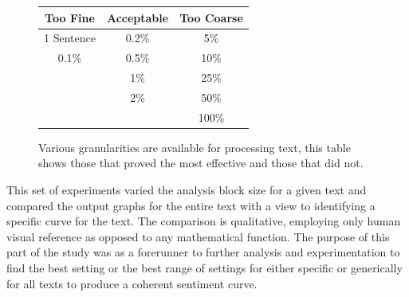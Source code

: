 \documentclass{article}
\begin{document}
        \begin{figure}[hbtp]
            \begin{center}
                \begin{tabular}{ |c|c|c| } 
                \hline
                \textbf{Too Fine} & \textbf{Acceptable} & \textbf{Too Coarse} \\ 
                \hline
                1 Sentence & 0.2\% & 5\% \\ 
                0.1\% & 0.5\% & 10\% \\
                & 1\% & 25\% \\
                & 2\% & 50\% \\
                &  & 100\% \\
                \hline
                \end{tabular}
            \end{center}
            \centering
            \caption{Various granularities are available for processing text, this table shows those that proved the most effective and those that did not.}
            \label{fig:granChart}
        \end{figure}
        This set of experiments varied the analysis block size for a given text and compared the output graphs for the entire text with a view to identifying a specific curve for the text. The comparison is qualitative, employing only human visual reference as opposed to any mathematical function. The purpose of this part of the study was as a forerunner to further analysis and experimentation to find the best setting or the best range of settings for either specific or generically for all texts to produce a coherent sentiment curve.
\end{document}
